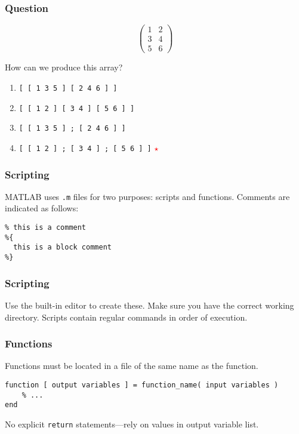\documentclass[11pt]{beamer}
\newcommand{\correctstar}{{\Large\textcolor{red}{$\star$}}}
\begin{document}
\begin{frame}[fragile]
  \frametitle{Question}
  \Enlarge
$$
\left(
\begin{array}{cc}
1 & 2 \\
3 & 4 \\
5 & 6
\end{array}
\right)
$$

How can we produce this array?

  \begin{enumerate}[label=\Alph*]
    \item  \texttt{[ [ 1 3 5 ] [ 2 4 6 ] ]}
    \item  \texttt{[ [ 1 2 ] [ 3 4 ] [ 5 6 ] ]}
    \item  \texttt{[ [ 1 3 5 ] ; [ 2 4 6 ] ]}
    \item  \texttt{[ [ 1 2 ] ; [ 3 4 ] ; [ 5 6 ] ]} \correctstar
  \end{enumerate}
\end{frame}

\begin{frame}[fragile]
  \frametitle{Scripting}
  \Enlarge

  \begin{enumerate}
  \myitem  MATLAB uses \texttt{.m} files for two purposes:  scripts and functions.
  \myitem  Comments are indicated as follows:
  \end{enumerate}
  \begin{Verbatim}
% this is a comment
%{
  this is a block comment
%}
  \end{Verbatim}
\end{frame}

\begin{frame}[fragile]
  \frametitle{Scripting}
  \Enlarge

  \begin{enumerate}
  \myitem  Use the built-in editor to create these.
  \myitem  Make sure you have the correct working directory.
  \myitem  Scripts contain regular commands in order of execution.
  \end{enumerate}
\end{frame}

\begin{frame}[fragile]
  \frametitle{Functions}
  \Enlarge

  \begin{enumerate}
  \myitem  Functions must be located in a file of the same name as the function.
  \end{enumerate}
  \begin{Verbatim}
function [ output variables ] = function_name( input variables )
    % ...
end
  \end{Verbatim}
  \begin{enumerate}
  \myitem  No explicit \texttt{return} statements---rely on values in output variable list.
  \end{enumerate}
\end{frame}
\end{document}
